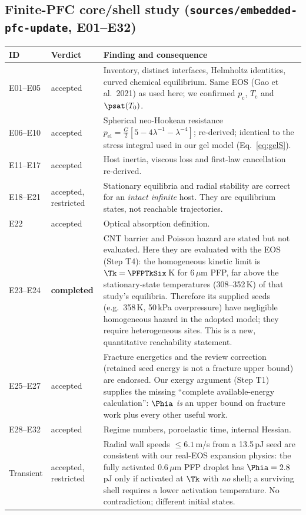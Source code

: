 \subsection{Finite-PFC core/shell study (\texttt{sources/embedded-pfc-update}, E01--E32)}
\begin{center}\small
\begin{longtable}{p{}p{}p{}}
\toprule ID & Verdict & Finding and consequence\\\midrule\endhead
E01--E05 & accepted & Inventory, distinct interfaces, Helmholtz identities, curved chemical equilibrium.
Same EOS (Gao et al.\ 2021) as used here; we confirmed $p_{\mathrm c}$, $T_{\mathrm c}$ and $\psat(T_0)$.\\
E06--E10 & accepted & Spherical neo-Hookean resistance $p_{\mathrm{el}}=\tfrac G2[5-4\lambda^{-1}-\lambda^{-4}]$;
re-derived; identical to the stress integral used in our gel model (Eq.~\eqref{eq:gelS}).\\
E11--E17 & accepted & Host inertia, viscous loss and first-law cancellation re-derived.\\
E18--E21 & accepted, restricted & Stationary equilibria and radial stability are correct for an
\emph{intact infinite} host. They are equilibrium states, not reachable trajectories.\\
E22 & accepted & Optical absorption definition.\\
E23--E24 & \textbf{completed} & CNT barrier and Poisson hazard are stated but not evaluated. Here they are
evaluated with the EOS (Step T4): the homogeneous kinetic limit is $\Tk=\PFPTkSix$\,K for 6\,$\mu$m
PFP, far above the stationary-state temperatures (308--352\,K) of that study's equilibria. Therefore its
supplied seeds (e.g.\ 358\,K, 50\,kPa overpressure) have negligible homogeneous hazard in the adopted model;
they require heterogeneous sites. This is a new, quantitative reachability statement.\\
E25--E27 & accepted & Fracture energetics and the review correction (retained seed energy is not a fracture
upper bound) are endorsed. Our exergy argument (Step T1) supplies the missing ``complete available-energy
calculation'': $\Phia$ \emph{is} an upper bound on fracture work plus every other useful work.\\
E28--E32 & accepted & Regime numbers, poroelastic time, internal Hessian.\\
Transient & accepted, restricted & Radial wall speeds $\le6.1$\,m/s from a 13.5\,pJ seed are consistent
with our real-EOS expansion physics: the fully activated 0.6\,$\mu$m PFP droplet has
$\Phia=2.8$\,pJ only if activated at $\Tk$ with \emph{no} shell; a surviving shell requires a lower
activation temperature. No contradiction; different initial states.\\
\bottomrule
\end{longtable}
\end{center}

